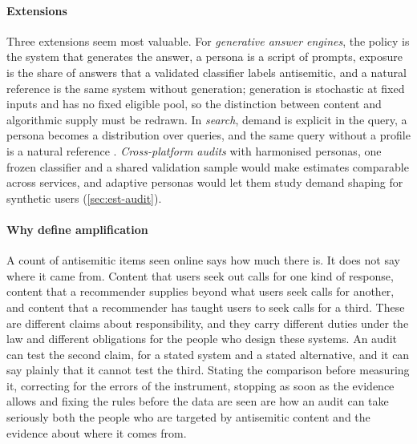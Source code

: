 \paragraph{Extensions}
Three extensions seem most valuable. For \emph{generative answer engines},
the policy is the system that generates the answer, a persona is a script of
prompts, exposure is the share of answers that a validated classifier labels
antisemitic, and a natural reference is the same system without generation;
generation is stochastic at fixed inputs and has no fixed eligible pool, so
the distinction between content and algorithmic supply must be redrawn. In
\emph{search}, demand is explicit in the query, a persona becomes a
distribution over queries, and the same query without a profile is a natural
reference \citep{robertson2023}. \emph{Cross-platform audits} with harmonised
personas, one frozen classifier and a shared validation sample would make
estimates comparable across services, and adaptive personas would let them
study demand shaping for synthetic users (\cref{sec:est-audit}).

\paragraph{Why define amplification}
A count of antisemitic items seen online says how much there is. It does not
say where it came from. Content that users seek out calls for one kind of
response, content that a recommender supplies beyond what users seek calls
for another, and content that a recommender has taught users to seek calls
for a third. These are different claims about responsibility, and they carry
different duties under the law and different obligations for the people who
design these systems. An audit can test the second claim, for a stated system
and a stated alternative, and it can say plainly that it cannot test the
third. Stating the comparison before measuring it, correcting for the errors
of the instrument, stopping as soon as the evidence allows and fixing the
rules before the data are seen are how an audit can take seriously both the
people who are targeted by antisemitic content and the evidence about where
it comes from.
